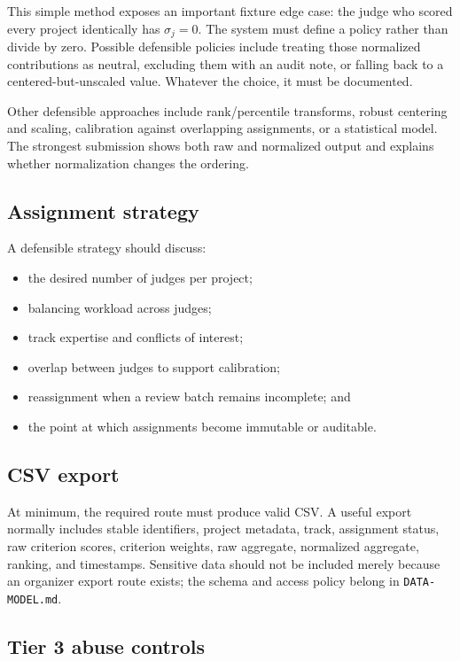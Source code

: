 \documentclass[11pt]{article}
\begin{document}
This simple method exposes an important fixture edge case: the judge who scored every project identically has $\sigma_j=0$. The system must define a policy rather than divide by zero. Possible defensible policies include treating those normalized contributions as neutral, excluding them with an audit note, or falling back to a centered-but-unscaled value. Whatever the choice, it must be documented.

Other defensible approaches include rank/percentile transforms, robust centering and scaling, calibration against overlapping assignments, or a statistical model. The strongest submission shows both raw and normalized output and explains whether normalization changes the ordering.

\subsection{Assignment strategy}

A defensible strategy should discuss:

\begin{itemize}
  \item the desired number of judges per project;
  \item balancing workload across judges;
  \item track expertise and conflicts of interest;
  \item overlap between judges to support calibration;
  \item reassignment when a review batch remains incomplete; and
  \item the point at which assignments become immutable or auditable.
\end{itemize}

\subsection{CSV export}

At minimum, the required route must produce valid CSV\@. A useful export normally includes stable identifiers, project metadata, track, assignment status, raw criterion scores, criterion weights, raw aggregate, normalized aggregate, ranking, and timestamps. Sensitive data should not be included merely because an organizer export route exists; the schema and access policy belong in \texttt{DATA-MODEL.md}.

\subsection{Tier 3 abuse controls}
\end{document}
